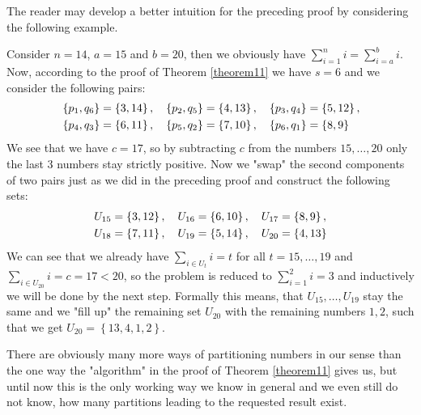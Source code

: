 The reader may develop a better intuition for the preceding proof by considering the following example.
\begin{expl}
Consider \(n=14\), \(a=15\) and \(b=20\), then we obviously have \(\sum\limits_{i=1}^ni=\sum\limits_{i=a}^bi\). Now, according to the proof of Theorem \ref{theorem11} we have \(s=6\) and we consider the following pairs:
\begin{align}
&\left\{p_1,q_6\right\}=\left\{3,14\right\},\quad \left\{p_2,q_5\right\}=\left\{4,13\right\},\quad \left\{p_3,q_4\right\}=\left\{5,12\right\},\notag\\
&\left\{p_4,q_3\right\}=\left\{6,11\right\},\quad \left\{p_5,q_2\right\}=\left\{7,10\right\},\quad \left\{p_6,q_1\right\}=\left\{8,9\right\}\notag
\end{align}
We see that we have \(c=17\), so by subtracting \(c\) from the numbers \(15,\ldots,20\) only the last 3 numbers stay strictly positive. Now we "swap" the second components of two pairs just as we did in the preceding proof and construct the following sets:
\begin{align}
&U_{15}=\left\{3,12\right\},\quad U_{16}=\left\{6,10\right\},\quad U_{17}=\left\{8,9\right\},\notag\\
&U_{18}=\left\{7,11\right\},\quad U_{19}=\left\{5,14\right\},\quad U_{20}=\left\{4,13\right\}\notag
\end{align}
We can see that we already have \(\sum\limits_{i\in U_t}i=t\) for all \(t=15,\ldots,19\) and\\
\(\sum\limits_{i\in U_{20}}i=c=17<20\), so the problem is reduced to \(\sum\limits_{i=1}^2i=3\) and inductively we will be done by the next step. Formally this means, that \(U_{15},\ldots,U_{19}\) stay the same and we "fill up" the remaining set \(U_{20}\) with the remaining numbers \(1,2\), such that we get \(U_{20}=\left\{13,4,1,2\right\}\).
\end{expl}
There are obviously many more ways of partitioning numbers in our sense than the one way the "algorithm" in the proof of Theorem \ref{theorem11} gives us, but until now this is the only working way we know in general and we even still do not know, how many partitions leading to the requested result exist.

